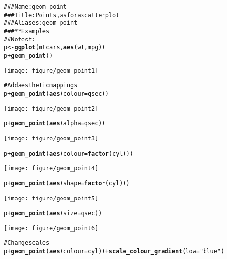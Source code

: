 \documentclass[a4paper,titlepage]{tufte-handout}\usepackage{graphicx, color}
\makeatletter
\def\maxwidth{ %
  \ifdim\Gin@nat@width>\linewidth
    \linewidth
  \else
    \Gin@nat@width
  \fi
}
\newcommand{\hlfunctioncall}[1]{\textcolor[rgb]{0.501960784313725,0,0.329411764705882}{\textbf{#1}}}%
\newcommand{\hlstring}[1]{\textcolor[rgb]{0.6,0.6,1}{#1}}%
\newcommand{\hlcomment}[1]{\textcolor[rgb]{0.180392156862745,0.6,0.341176470588235}{#1}}%
\newenvironment{kframe}{%
 \def\at@end@of@kframe{}%
 \ifinner\ifhmode%
  \def\at@end@of@kframe{\end{minipage}}%
  \begin{minipage}{\columnwidth}%
 \fi\fi%
 \def\FrameCommand##1{\hskip\@totalleftmargin \hskip-\fboxsep
 \colorbox{shadecolor}{##1}\hskip-\fboxsep
     \hskip-\linewidth \hskip-\@totalleftmargin \hskip\columnwidth}%
 \MakeFramed {\advance\hsize-\width
   \@totalleftmargin\z@ \linewidth\hsize
   \@setminipage}}%
 {\par\unskip\endMakeFramed%
 \at@end@of@kframe}
\newenvironment{knitrout}{}{} %
\makeatother
\begin{document}
\begin{knitrout}
\color{fgcolor}\begin{kframe}
\begin{alltt}
\hlcomment{### Name: geom_point}
\hlcomment{### Title: Points, as for a scatterplot}
\hlcomment{### Aliases: geom_point}
\hlcomment{### ** Examples}
\hlcomment{## No test: }
p <- \hlfunctioncall{ggplot}(mtcars, \hlfunctioncall{aes}(wt, mpg))
p + \hlfunctioncall{geom_point}()
\end{alltt}
\end{kframe}\texttt{[image: figure/geom\_point1]} \begin{kframe}\begin{alltt}
\hlcomment{# Add aesthetic mappings}
p + \hlfunctioncall{geom_point}(\hlfunctioncall{aes}(colour = qsec))
\end{alltt}
\end{kframe}\texttt{[image: figure/geom\_point2]} \begin{kframe}\begin{alltt}
p + \hlfunctioncall{geom_point}(\hlfunctioncall{aes}(alpha = qsec))
\end{alltt}
\end{kframe}\texttt{[image: figure/geom\_point3]} \begin{kframe}\begin{alltt}
p + \hlfunctioncall{geom_point}(\hlfunctioncall{aes}(colour = \hlfunctioncall{factor}(cyl)))
\end{alltt}
\end{kframe}\texttt{[image: figure/geom\_point4]} \begin{kframe}\begin{alltt}
p + \hlfunctioncall{geom_point}(\hlfunctioncall{aes}(shape = \hlfunctioncall{factor}(cyl)))
\end{alltt}
\end{kframe}\texttt{[image: figure/geom\_point5]} \begin{kframe}\begin{alltt}
p + \hlfunctioncall{geom_point}(\hlfunctioncall{aes}(size = qsec))
\end{alltt}
\end{kframe}\texttt{[image: figure/geom\_point6]} \begin{kframe}\begin{alltt}
\hlcomment{# Change scales}
p + \hlfunctioncall{geom_point}(\hlfunctioncall{aes}(colour = cyl)) + \hlfunctioncall{scale_colour_gradient}(low = \hlstring{"blue"})

\end{alltt}
\end{kframe}
\end{knitrout}
\end{document}
